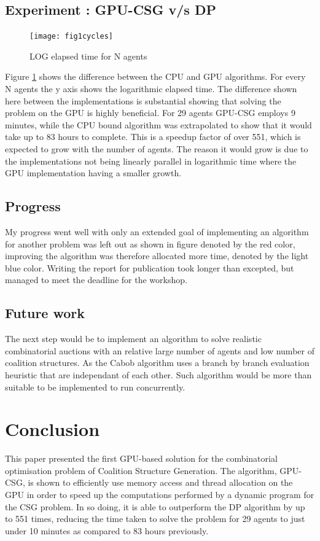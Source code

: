 \documentclass[a4paper, 12pt]{report}
\begin{document}
\subsection{Experiment : GPU-CSG v/s DP}
\begin{figure}[htbp]\centering
\texttt{[image: fig1cycles]}
\caption{LOG elapsed time for N agents\label{time}}
\end{figure}
Figure \ref{time} shows the difference between the CPU and GPU algorithms.
For every N agents the y axis shows the logarithmic elapsed time. The difference
shown here between the implementations is substantial showing
that solving the problem on the GPU is highly beneficial. For 29 agents GPU-CSG
employs 9 minutes, while the CPU bound algorithm was extrapolated to show that
it would take up to 83 hours to complete. This is a speedup factor of over 551,
which is expected to grow with the number of agents. The reason it would grow is
due to the implementations not being linearly parallel in logarithmic time where
the GPU implementation having a smaller growth.




\subsection{Progress}

My progress went well with only an extended goal of implementing an algorithm for another problem was left out as shown in figure \label{actual} denoted by the red color,
improving the algorithm was therefore allocated more time, denoted by the light blue color.
Writing the report for publication took longer than excepted, but managed to meet the deadline for the workshop.


\subsection{Future work}
The next step would be to implement an algorithm to solve
realistic combinatorial auctions with an relative large number of agents and low
number of coalition structures.
As the Cabob algorithm uses a branch by branch evaluation heuristic that are
independant of each other.
Such algorithm would be more than suitable to be implemented to run
concurrently. \\

\section{Conclusion}
This paper presented the first GPU-based solution for the combinatorial
optimisation problem of Coalition Structure Generation. The algorithm, GPU-CSG,
is shown to efficiently use memory access and thread allocation on the GPU in
order to speed up the computations performed by a dynamic program for the CSG
problem. In so doing, it is able to outperform the DP algorithm by up to 551
times, reducing the time taken to solve the problem for 29 agents to just under
10 minutes as compared to 83 hours previously.
\end{document}
